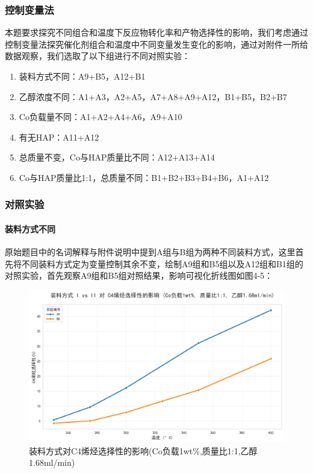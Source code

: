 \subsubsection{控制变量法}
本题要求探究不同组合和温度下反应物转化率和产物选择性的影响，我们考虑通过控制变量法探究催化剂组合和温度中不同变量发生变化的影响，通过对附件一所给数据观察，我们选取了以下组进行不同对照实验：

\begin{enumerate}
	\item 装料方式不同：A9+B5，A12+B1
	\item 乙醇浓度不同：A1+A3，A2+A5，A7+A8+A9+A12，B1+B5，B2+B7
	\item Co负载量不同：A1+A2+A4+A6，A9+A10
	\item 有无HAP：A11+A12
	\item 总质量不变，Co与HAP质量比不同：A12+A13+A14
	\item Co与HAP质量比1:1，总质量不同：B1+B2+B3+B4+B6，A1+A12
\end{enumerate}

\subsubsection{对照实验}
\paragraph{装料方式不同}

原始题目中的名词解释与附件说明中提到A组与B组为两种不同装料方式，这里首先将不同装料方式定为变量控制其余不变，绘制A9组和B5组以及A12组和B1组的对照实验，首先观察A9组和B5组对照结果，影响可视化折线图如图4-5：

\begin{figure}[h]%
	\centering%
	\includegraphics [scale=0.6]{图/2-1-2-1.png}
	\caption{装料方式对C4烯烃选择性的影响(Co负载1wt\%,质量比1:1,乙醇1.68ml/min)} 
	\label{fig:1}
\end{figure}

